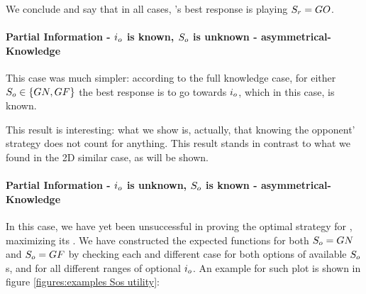 \documentclass[a4paper,english,10pt]{article}
\begin{document}
We conclude and say that in all cases, {\rob}'s best response is playing $S_r=GO$.





\paragraph{Partial Information - $i_o$ is known, $S_o$ is unknown - asymmetrical-Knowledge}
This case was much simpler: according to the full knowledge case, for either $S_o \in \lbrace GN,GF \rbrace$ the best response is to go towards $i_o$, which in this case, is known.

This result is interesting: what we show is, actually, that knowing the opponent' strategy does not count for anything. This result stands in contrast to what we found in the 2D similar case, as will be shown.

\paragraph{Partial Information - $i_o$ is unknown, $S_o$ is known - asymmetrical-Knowledge} \label{sections:1D unknown io known so}
In this case, we have yet been unsuccessful in proving the optimal strategy for \rob, maximizing its \fcc. We have constructed the expected \fcc functions for both $S_o = GN$ and $S_o = GF$ by checking each and different case for both options of available $S_o$s, and for all different ranges of optional $i_o$. An example for such plot is shown in figure \ref{figures:examples Sos utility}:
\end{document}
